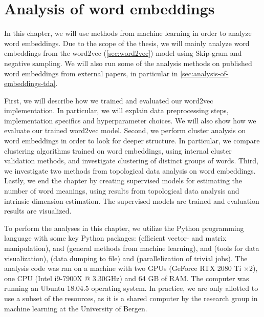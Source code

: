 \chapter{Analysis of word embeddings}
\label{chap:analysis-of-word-embeddings}
In this chapter, we will use methods from machine learning in order to analyze word embeddings. Due to the scope of the thesis, we will mainly analyze word embeddings from the word2vec (\cref{sec:word2vec}) model using Skip-gram and negative sampling. We will also run some of the analysis methods on published word embeddings from external papers, in particular in \cref{sec:analysis-of-embeddings-tda}.

First, we will describe how we trained and evaluated our word2vec implementation. In particular, we will explain data preprocessing steps, implementation specifics and hyperparameter choices. We will also show how we evaluate our trained word2vec model. Second, we perform cluster analysis on word embeddings in order to look for deeper structure. In particular, we compare clustering algorithms trained on word embeddings, using internal cluster validation methods, and investigate clustering of distinct groups of words. Third, we investigate two methods from topological data analysis on word embeddings. Lastly, we end the chapter by creating supervised models for estimating the number of word meanings, using results from topological data analysis and intrinsic dimension estimation. The supervised models are trained and evaluation results are visualized.

To perform the analyses in this chapter, we utilize the Python programming language with some key Python packages:  \cite{2020NumPy-Array} (efficient vector- and matrix manipulation),  \cite{ScikitLearn2011} and  \cite{2020SciPy-NMeth} (general methods from machine learning),  \cite{Matplotlib2007} and  \cite{seaborn2021} (tools for data visualization),  \cite{joblib2021} (data dumping to file) and   \cite{sharedmem2017} (parallelization of trivial jobs). The analysis code was ran on a machine with two GPUs (GeForce RTX 2080 Ti $\times2$), one CPU (Intel i9-7900X @ 3.30GHz) and 64 GB of RAM. The computer was running an Ubuntu 18.04.5 operating system. In practice, we are only allotted to use a subset of the resources, as it is a shared computer by the research group in machine learning at the University of Bergen.




